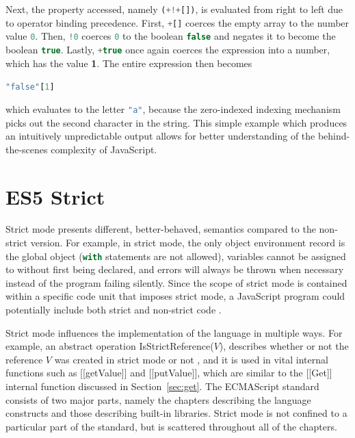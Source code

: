 \documentclass[a4paper,11pt,twoside]{report}
\def\jsinline{\lstinline[language=JavaScript, basicstyle=\small]}%\end{lstlisting}
\begin{document}
Next, the property accessed, namely \jsinline|(+!+[])|, is evaluated from right to left due to operator binding precedence. First, \jsinline|+[]| coerces the empty array to the number value \jsinline|0|. Then, \jsinline|!0| coerces \jsinline|0| to the boolean \jsinline|false| and negates it to become the boolean \jsinline{true}. Lastly, \jsinline|+true| once again coerces the expression into a number, which has the value \textbf{1}. The entire expression then becomes
\begin{center}
\jsinline|"false"[1]|
\end{center}
\noindent which evaluates to the letter \jsinline|"a"|, because the zero-indexed indexing mechanism picks out the second character in the string. This simple example which produces an intuitively unpredictable output allows for better understanding of the behind-the-scenes complexity of JavaScript.

\section{ES5 Strict}\label{sec:strict}
Strict mode presents different, better-behaved, semantics compared to the non-strict version. For example, in strict mode, the only object environment record is the global object (\jsinline|with| statements are not allowed), variables cannot be assigned to without first being declared, and errors will always be thrown when necessary instead of the program failing silently. Since the scope of strict mode is contained within a specific code unit that imposes strict mode, a JavaScript program could potentially include both strict and non-strict code \cite{EcmaScript}.

Strict mode influences the implementation of the language in multiple ways. For example, an abstract operation IsStrictReference($V$), describes whether or not the reference $V$ was created in strict mode or not \cite{EcmaScript}, and it is used in vital internal functions such as [[getValue]] and [[putValue]], which are similar to the [[Get]] internal function discussed in Section~\ref{sec:get}. The ECMAScript standard consists of two major parts, namely the chapters describing the language constructs and those describing built-in libraries. Strict mode is not confined to a particular part of the standard, but is scattered throughout all of the chapters. 

\end{document}
